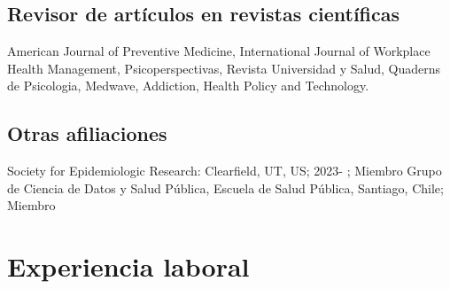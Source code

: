 \documentclass[11pt,a4paper,]{awesome-cv}
\begin{document}
\begin{cventries}
    \vspace{-4.0mm}
    \vspace{-4.0mm}
    \vspace{-4.0mm}
    \vspace{-4.0mm}
\end{cventries}

\hfill \break

\fontsize{10pt}{1.5em}\color{text}

\hypertarget{revisor-de-artuxedculos-en-revistas-cientuxedficas}{%
\subsection{Revisor de artículos en revistas
científicas}\label{revisor-de-artuxedculos-en-revistas-cientuxedficas}}

\begin{footnotesize}
American Journal of Preventive Medicine, International Journal of Workplace Health Management, Psicoperspectivas, Revista Universidad y Salud, Quaderns de Psicologia, Medwave, Addiction, Health Policy and Technology.
\end{footnotesize}
\fontsize{10pt}{1.5em}\color{text}

\hfill \break

\hypertarget{otras-afiliaciones}{%
\subsection{Otras afiliaciones}\label{otras-afiliaciones}}

\begin{footnotesize}
Society for Epidemiologic Research: Clearfield, UT, US; 2023- ; Miembro
Grupo de Ciencia de Datos y Salud Pública, Escuela de Salud Pública, Santiago, Chile; Miembro
\end{footnotesize}
\pagebreak

\linebreak

\hypertarget{experiencia-laboral-1}{%
\section{Experiencia laboral}\label{experiencia-laboral-1}}
\end{document}
